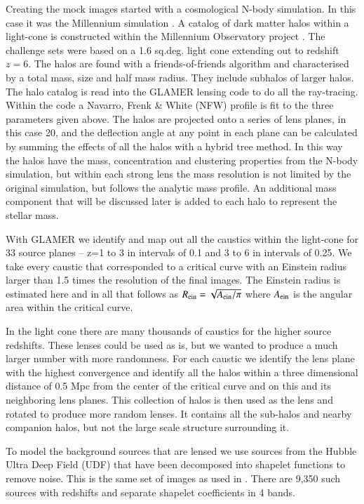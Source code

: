 \documentclass{aa}
\begin{document}
Creating the mock images started with a cosmological N-body simulation.  In this case it was the Millennium simulation \citep{2009MNRAS.398.1150B}.   A catalog of dark matter halos within a light-cone is constructed within the Millennium Observatory project \citep{2013MNRAS.428..778O}.   The challenge sets were based on a 1.6 sq.deg. light cone extending out to redshift $z=6$.  The halos are found with a friends-of-friends algorithm and characterised by a total mass, size and half mass radius.  They include subhalos of larger halos.  The halo catalog is read into the GLAMER lensing code \citep{2014MNRAS.445.1942M,2014MNRAS.445.1954P} to do all the ray-tracing.    Within the code a Navarro, Frenk \& White (NFW) \citep{1996ApJ...462..563N} profile is fit to the three parameters given above.  The halos are projected onto a series of lens planes, in this case 20,  and the deflection angle at any point in each plane can be calculated by summing the effects of all the halos with a hybrid tree method.  In this way the halos have the mass, concentration and clustering properties from the N-body simulation, but within each strong lens the mass resolution is not limited by the original simulation, but follows the analytic mass profile.   An additional mass component that will be discussed later is added to each halo to represent the stellar mass.

With GLAMER we identify and map out all the caustics within the light-cone for 33 source planes -- z=1 to 3 in intervals of 0.1 and 3 to 6 in intervals of 0.25.  We take every caustic that corresponded to a critical curve with an Einstein radius larger than 1.5 times the resolution of the final images.  The Einstein radius is estimated here and in all that follows as $R_{\rm ein}=\sqrt{A_{\rm ein}/\pi}$ where $A_{\rm ein}$ is the angular area within the critical curve.

 In the light cone there are many thousands of caustics for the higher source redshifts.  These lenses could be used as is, but we wanted to produce a much larger number with more randomness.   For each caustic we identify the lens plane with the highest convergence and identify all the halos within a three dimensional distance of 0.5 Mpc from the center of the critical curve and on this and its neighboring lens planes.    This collection of halos is then used as the lens and rotated to produce more random lenses.    It  contains all the sub-halos and nearby companion halos, but not the large scale structure surrounding it.

To model the background sources that are lensed we use sources from the Hubble Ultra Deep Field (UDF) that have been decomposed into shapelet functions to remove noise.  This is the same set of images as used in \citet{2008AandA...482..403M,2010AandA...514A..93M,2016arXiv160604548M}.   There are 9,350 such sources with redshifts and separate shapelet coefficients in 4 bands.   
\end{document}
